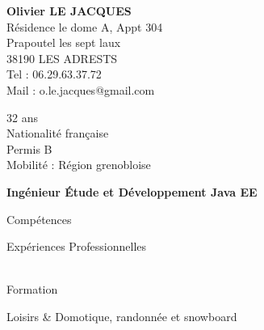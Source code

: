 \documentclass{cv}
\newcommand{\educationdir}{french/education}
\newcommand{\experiencedir}{french/experience}
\newcommand{\skilldir}{french/skill}
\newlength{\firstcolumnwidth}%
\begin{document}
\begin{chapeau}
	\begin{adresse}
		\textbf{Olivier LE JACQUES}\\
		Résidence le dome A, Appt 304\\
		Prapoutel les sept laux\\
		38190 LES ADRESTS\\
		Tel : 06.29.63.37.72\\
		Mail : o.le.jacques@gmail.com\\
	\end{adresse}
	\begin{etatcivil}
		32 ans \\
        Nationalité française \\
		Permis B \\
        Mobilité : Région grenobloise \\
	\end{etatcivil}
\end{chapeau}

\vspace{0.2cm}

\begin{center}
	\textbf{\huge{Ingénieur Étude et Développement Java EE}}
\end{center}

\vspace{0.2cm}

\begin{rubriquetableau}[\firstcolumnwidth]{Compétences}
	
	
\end{rubriquetableau}

\begin{rubriquetableau}[\firstcolumnwidth]{Expériences Professionnelles}
     \\
	 \\
\end{rubriquetableau}
    
\begin{rubriquetableau}[\firstcolumnwidth]{Formation}
    
    
    
\end{rubriquetableau}

\begin{rubriquetableau}[\firstcolumnwidth]{Loisirs}
	& Domotique, randonnée et snowboard
\end{rubriquetableau}
\end{document}
